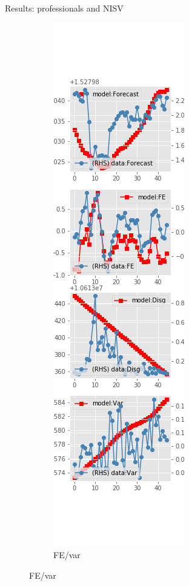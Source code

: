 \documentclass{beamer}
\begin{document}
\begin{frame}{Results: professionals and NISV}
\begin{figure}[ht]
\begin{subfigure}[b]{0.19\textwidth}
		\end{subfigure}
		\hfill
		\begin{subfigure}[b]{0.19\textwidth}
			\caption{FE/var}
			\includegraphics[width=\textwidth, height = 0.8\textheight]{figuresDraft/spf_ni_est_sv_diag3.png}

\end{subfigure}
\end{figure}
\end{frame}
\end{document}
